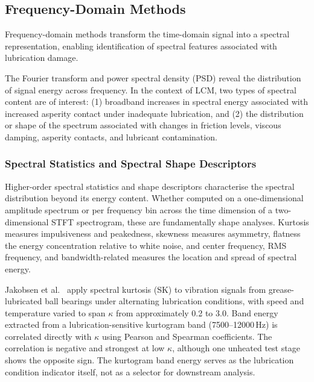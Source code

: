 \subsection{Frequency-Domain Methods}
\label{subsec:sp_freq}

Frequency-domain methods transform the time-domain signal into a spectral representation, enabling identification of spectral features associated with lubrication damage.

The Fourier transform and power spectral density (PSD) reveal the distribution of signal energy across frequency. In the context of LCM, two types of spectral content are of interest: (1) broadband increases in spectral energy associated with increased asperity contact under inadequate lubrication, and (2) the distribution or shape of the spectrum associated with changes in friction levels, viscous damping, asperity contacts, and lubricant contamination.

\subsubsection{Spectral Statistics and Spectral Shape Descriptors}
\label{subsubsec:spectral_shape}
Higher-order spectral statistics and shape descriptors characterise the spectral distribution beyond its energy content. Whether computed on a one-dimensional amplitude spectrum or per frequency bin across the time dimension of a two-dimensional STFT spectrogram, these are fundamentally shape analyses. Kurtosis measures impulsiveness and peakedness, skewness measures asymmetry, flatness the energy concentration relative to white noise, and center frequency, RMS frequency, and bandwidth-related measures the location and spread of spectral energy.

Jakobsen et al.\ \cite{jakobsen_vibration_2021} apply spectral kurtosis (SK) to vibration signals from grease-lubricated ball bearings under alternating lubrication conditions, with speed and temperature varied to span $\kappa$ from approximately 0.2 to 3.0. Band energy extracted from a lubrication-sensitive kurtogram band (7500--12000\,Hz) is correlated directly with $\kappa$ using Pearson and Spearman coefficients. The correlation is negative and strongest at low $\kappa$, although one unheated test stage shows the opposite sign. The kurtogram band energy serves as the lubrication condition indicator itself, not as a selector for downstream analysis.


